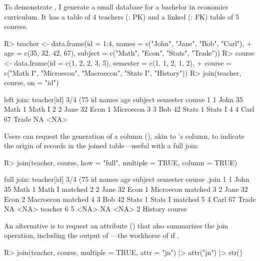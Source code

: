 \documentclass[nojss]{jss} %
\newcommand{\fct}[1]{\code{#1()}}
\begin{document}
To demonstrate \fct{join}, I generate a small database for a bachelor in economics curriculum. It has a  table of 4 teachers (: PK) and a linked (: FK)  table of 5 courses.
%
\begin{Schunk}
\begin{Sinput}
R> teacher <- data.frame(id = 1:4, names = c("John", "Jane", "Bob", "Carl"),
+    age = c(35, 32, 42, 67), subject = c("Math", "Econ", "Stats", "Trade"))
R> course <- data.frame(id = c(1, 2, 2, 3, 5), semester = c(1, 1, 2, 1, 2),
+    course = c("Math I", "Microecon", "Macroecon", "Stats I", "History"))
R> join(teacher, course, on = "id")
\end{Sinput}
\begin{Soutput}
left join: teacher[id] 3/4 (75%) <1:1st> course[id] 3/5 (60%)
  id names age subject semester    course
1  1  John  35    Math        1    Math I
2  2  Jane  32    Econ        1 Microecon
3  3   Bob  42   Stats        1   Stats I
4  4  Carl  67   Trade       NA      <NA>
\end{Soutput}
\end{Schunk}
%
Users can request the generation of a  column (), akin to 's  column, to indicate the origin of records in the joined table---useful with a full join:
%
\begin{Schunk}
\begin{Sinput}
R> join(teacher, course, how = "full", multiple = TRUE, column = TRUE)
\end{Sinput}
\begin{Soutput}
full join: teacher[id] 3/4 (75%) <1:1.33> course[id] 4/5 (80%)
  id names age subject semester    course   .join
1  1  John  35    Math        1    Math I matched
2  2  Jane  32    Econ        1 Microecon matched
3  2  Jane  32    Econ        2 Macroecon matched
4  3   Bob  42   Stats        1   Stats I matched
5  4  Carl  67   Trade       NA      <NA> teacher
6  5  <NA>  NA    <NA>        2   History  course
\end{Soutput}
\end{Schunk}
%
An alternative is to request an attribute () that also summarizes the join operation, including the output of \fct{fmatch}---the workhorse of \fct{join} if .
\begin{Code}
R> join(teacher, course, multiple = TRUE, attr = "jn") |> attr("jn") |> str()
\end{Code}
\begin{Schunk}
\end{Schunk}
\end{document}
